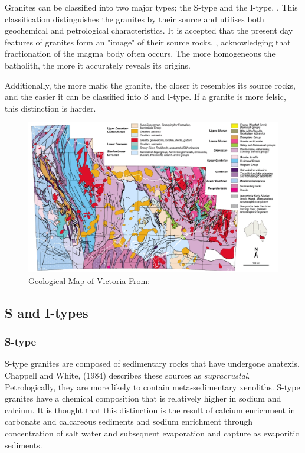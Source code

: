 \documentclass[a4paper]{article}
\begin{document}
Granites can be classified into two major types; the S-type and the I-type, \cite{BWChappell}. This classification distinguishes the granites by their source and utilises both geochemical and petrological characteristics. It is accepted that the present day features of granites form an "image" of their source rocks, \cite{hine1978contrasts}, acknowledging that fractionation of the magma body often occurs. The more homogeneous the batholith, the more it accurately reveals its origins. 

Additionally, the more mafic the granite, the closer it resembles its source rocks, and the easier it can be classified into S and I-type. If a granite is more felsic, this distinction is harder.   


\begin{figure}[H]
\centering
\includegraphics[width=1\textwidth]{vicmaprocktypes.jpg}
\caption{\label{fig:VicMapRockTypes}Geological Map of Victoria From: \cite{vandenberg2000tasman}}
\end{figure}

\subsection{S and I-types}

\subsubsection{S-type}
S-type granites are composed of sedimentary rocks that have undergone anatexis. Chappell and White, (1984) describes these sources as \textit{supracrustal}.
Petrologically, they are more likely to contain meta-sedimentary xenoliths. S-type granites have a chemical composition that is relatively higher in sodium and calcium. It is thought that this distinction is the result of calcium enrichment in carbonate and calcareous sediments and sodium enrichment through concentration of salt water and subsequent evaporation and capture as evaporitic sediments. 
\end{document}
